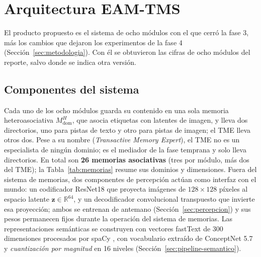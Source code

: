 \section{Arquitectura EAM-TMS}
\label{sec:arquitectura}

El producto propuesto es el sistema de ocho módulos con el que cerró la fase 3, más los
cambios que dejaron los experimentos de la fase 4 (Sección~\ref{sec:metodologia}).
Con él se obtuvieron las cifras de ocho módulos del reporte, salvo donde se indica otra
versión.

\subsection{Componentes del sistema}
\label{sec:componentes}

Cada uno de los ocho módulos guarda su contenido en una sola memoria heteroasociativa
$M^H_{\mathrm{dom}}$, que asocia etiquetas con latentes de imagen, y lleva dos directorios,
uno para pistas de texto y otro para pistas de imagen; el TME lleva otros dos.
Pese a su nombre (\textit{Transactive Memory Expert}), el TME no es un especialista de
ningún dominio; es el mediador de la fase temprana y solo lleva directorios.
En total son \textbf{26 memorias asociativas} (tres por módulo, más dos del TME); la
Tabla~\ref{tab:memorias} resume sus dominios y dimensiones.
Fuera del sistema de memorias, dos componentes de percepción actúan como interfaz con
el mundo: un codificador ResNet18 \cite{he2016resnet} que proyecta imágenes de $128\times128$
píxeles al espacio latente $\mathbf{z} \in \mathbb{R}^{64}$, y un decodificador convolucional
transpuesto que invierte esa proyección; ambos se entrenan de antemano
(Sección~\ref{sec:percepcion}) y sus pesos permanecen fijos durante la operación del
sistema de memorias.
Las representaciones semánticas se construyen con vectores fastText de 300 dimensiones
\cite{bojanowski2017fasttext} procesados por spaCy \cite{honnibal2020spacy}, con
vocabulario extraído de ConceptNet 5.7 \cite{speer2017conceptnet} y
\emph{cuantización por magnitud} en 16 niveles (Sección~\ref{sec:pipeline-semantico}).

